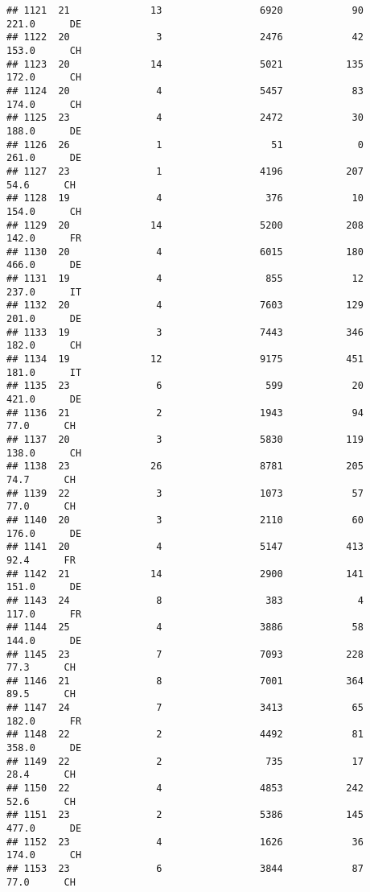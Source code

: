 \documentclass[
]{article}
\begin{document}
\begin{verbatim}
## 1121  21              13                 6920            90    221.0      DE
## 1122  20               3                 2476            42    153.0      CH
## 1123  20              14                 5021           135    172.0      CH
## 1124  20               4                 5457            83    174.0      CH
## 1125  23               4                 2472            30    188.0      DE
## 1126  26               1                   51             0    261.0      DE
## 1127  23               1                 4196           207     54.6      CH
## 1128  19               4                  376            10    154.0      CH
## 1129  20              14                 5200           208    142.0      FR
## 1130  20               4                 6015           180    466.0      DE
## 1131  19               4                  855            12    237.0      IT
## 1132  20               4                 7603           129    201.0      DE
## 1133  19               3                 7443           346    182.0      CH
## 1134  19              12                 9175           451    181.0      IT
## 1135  23               6                  599            20    421.0      DE
## 1136  21               2                 1943            94     77.0      CH
## 1137  20               3                 5830           119    138.0      CH
## 1138  23              26                 8781           205     74.7      CH
## 1139  22               3                 1073            57     77.0      CH
## 1140  20               3                 2110            60    176.0      DE
## 1141  20               4                 5147           413     92.4      FR
## 1142  21              14                 2900           141    151.0      DE
## 1143  24               8                  383             4    117.0      FR
## 1144  25               4                 3886            58    144.0      DE
## 1145  23               7                 7093           228     77.3      CH
## 1146  21               8                 7001           364     89.5      CH
## 1147  24               7                 3413            65    182.0      FR
## 1148  22               2                 4492            81    358.0      DE
## 1149  22               2                  735            17     28.4      CH
## 1150  22               4                 4853           242     52.6      CH
## 1151  23               2                 5386           145    477.0      DE
## 1152  23               4                 1626            36    174.0      CH
## 1153  23               6                 3844            87     77.0      CH

\end{verbatim}
\end{document}
